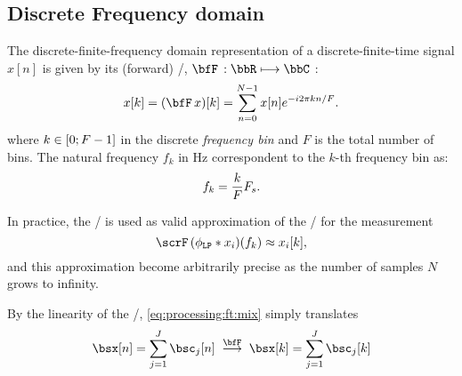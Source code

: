 \subsection{Discrete Frequency domain}
The discrete-finite-frequency domain representation of a discrete-finite-time signal $x[n]$ is given by its (forward) \DFTdef/, $\discreteFT{}:\bbR\kmapsto\bbC$
:
\begin{equation}\label{eq:processing:dft}
    x[k] = (\discreteFT{x})[k] =
    \sum_{n = 0}^{N - 1}
    x[n]
    \cste^{-\csti2\pi k n / F}.
\end{equation}
where $k \in \kintervcc{0}{F - 1}$ in the discrete \textit{frequency bin} and $F$ is the total number of bins.
The natural frequency $f_k$ in $\si{\Hz}$ correspondent to the $k$-th frequency bin as:
\begin{equation}
    f_k = \frac{k}{F}F_s
    .
\end{equation}

In practice, the \DFT/ is used as valid approximation of the \FT/ for the measurement
\begin{equation}
    \fourierTrans{(\lowpassfilter \conv x_i)} (f_k) \approx x_i[k]
    ,
\end{equation}
and this approximation become arbitrarily precise as the number of samples $N$ grows to infinity.

By the linearity of the \DFT/, \cref{eq:processing:ft:mix} simply translates
\begin{equation}\label{eq:processing:ft:mix}
    \mics[ n] = \sum_{\idxSrc=1}^{\numSrcs} \imgs_\idxSrc[ n]
    \;\overset{\discreteFT}{\kto}\;
    \mics[ k] = \sum_{\idxSrc=1}^{\numSrcs} \imgs_\idxSrc[ k]
\end{equation}


